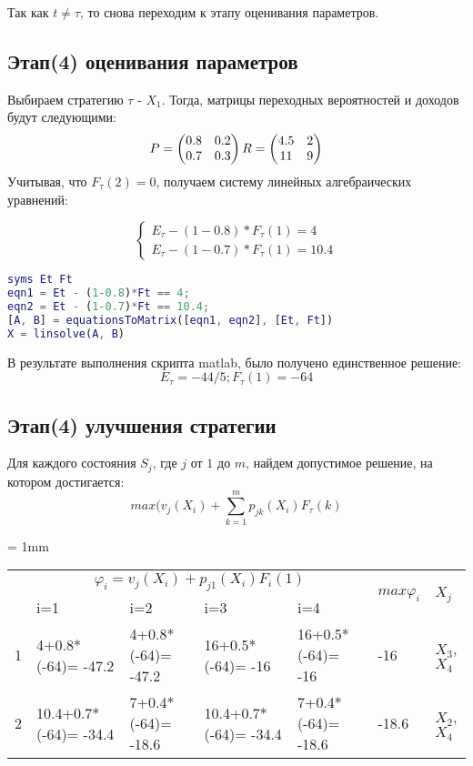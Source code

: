 Так как $t\neq\tau$, то снова переходим к этапу оценивания параметров.


\subsection{Этап(4) оценивания параметров}
Выбираем стратегию $\tau$ - $X_1$.  Тогда, матрицы переходных вероятностей и доходов будут следующими:
\begin{equation*}
P=\begin{pmatrix}
0.8 & 0.2\\
0.7 & 0.3
\end{pmatrix}\\
R=\begin{pmatrix}
4.5 & 2\\
11 & 9
\end{pmatrix}
\end{equation*}
Учитывая, что  $F_{\tau}(2)=0$, получаем систему линейных алгебраических уравнений:

\begin{equation*}
\begin{cases}
E_{\tau}-(1-0.8)*F_{\tau}(1)=4\\
E_{\tau}-(1-0.7)*F_{\tau}(1)=10.4
\end{cases}
\end{equation*}
\begin{lstlisting}[language={matlab}, caption={Скрпит для решения системы уравнений}, basicstyle=\ttfamily]
syms Et Ft
eqn1 = Et - (1-0.8)*Ft == 4;
eqn2 = Et - (1-0.7)*Ft == 10.4;
[A, B] = equationsToMatrix([eqn1, eqn2], [Et, Ft])
X = linsolve(A, B)
\end{lstlisting}
В результате выполнения скрипта matlab, было получено единственное решение:
\begin{equation*}
E_{\tau}=-44/5; F_{\tau}(1)=-64
\end{equation*}

\subsection{Этап(4) улучшения стратегии}
Для каждого состояния $S_j$, где $j$ от $1$ до $m$, найдем допустимое решение, на котором достигается:
\begin{equation*}
max(v_j(X_i)+\sum_{k=1}^mp_{jk}(X_i)F_{\tau}(k)
\end{equation*}


\tabulinesep = 1mm
\begin{longtabu} to \textwidth {|X[1, c , m ] |X[3, c , m ] | X[3,c , m ]|X[3,c , m ]|X[3,c , m ]| X[2,c , m ]|X[1,c , m ]|}\firsthline\hline

 &  &  & \\ 
&i=1&i=2&i=3&i=4&&\\ &4+0.8*(-64)= -47.2&4+0.8*(-64)= -47.2&16+0.5*(-64)= -16&16+0.5*(-64)= -16&-16&$X_3$, $X_4$\\ &10.4+0.7*(-64)= -34.4&7+0.4*(-64)= -18.6&10.4+0.7*(-64)= -34.4&7+0.4*(-64)= -18.6&-18.6&$X_2$, $X_4$\\ \hline
\end{longtabu}

